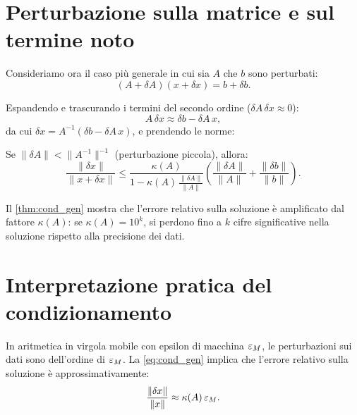 \section{Perturbazione sulla matrice e sul termine noto}
\label{sec:pert_Ab}

Consideriamo ora il caso più generale in cui sia $A$ che $b$ sono perturbati:
\begin{equation}
  (A + \delta A)(x + \delta x) = b + \delta b.
  \label{eq:pert_Ab}
\end{equation}

Espandendo e trascurando i termini del secondo ordine ($\delta A\,\delta x \approx 0$):
\begin{equation}
  A\,\delta x \approx \delta b - \delta A\, x,
\end{equation}
da cui $\delta x = A^{-1}(\delta b - \delta A\, x)$, e prendendo le norme:

\begin{theorem}
\label{thm:cond_gen}
Se $\|\delta A\| < \|A^{-1}\|^{-1}$ (perturbazione piccola), allora:
\begin{equation}
  \frac{\|\delta x\|}{\|x + \delta x\|} \leq
  \frac{\kappa(A)}{1 - \kappa(A)\,\frac{\|\delta A\|}{\|A\|}}
  \left(\frac{\|\delta A\|}{\|A\|} + \frac{\|\delta b\|}{\|b\|}\right).
  \label{eq:cond_gen}
\end{equation}
\end{theorem}

\begin{remark}
Il \cref{thm:cond_gen} mostra che l'errore relativo sulla soluzione è amplificato dal
fattore $\kappa(A)$: se $\kappa(A) = 10^k$, si perdono fino a $k$ cifre significative
nella soluzione rispetto alla precisione dei dati.
\end{remark}

\section{Interpretazione pratica del condizionamento}
\label{sec:interpretazione}

In aritmetica in virgola mobile con epsilon di macchina $\varepsilon_M$, le perturbazioni
sui dati sono dell'ordine di $\varepsilon_M$. La \cref{eq:cond_gen} implica che l'errore
relativo sulla soluzione è approssimativamente:
\begin{equation}
  \frac{\|\delta x\|}{\|x\|} \approx \kappa(A)\,\varepsilon_M.
  \label{eq:errore_pratico}
\end{equation}

